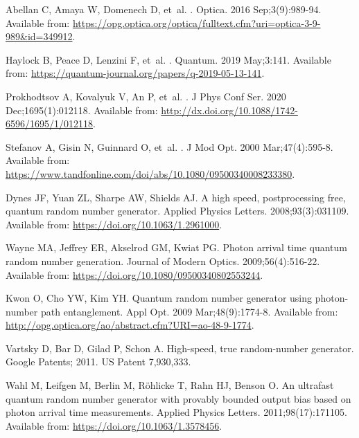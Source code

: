 \documentclass[]{interact}
\theoremstyle{plain}%
\theoremstyle{definition}
\theoremstyle{remark}
\begin{document}
\begin{thebibliography}{100}
Abellan C, Amaya W, Domenech D, et~al.
.
\newblock Optica. 2016 Sep;3(9):989-94.
\newblock Available from:
  \url{https://opg.optica.org/optica/fulltext.cfm?uri=optica-3-9-989&id=349912}.

Haylock B, Peace D, Lenzini F, et~al.
.
\newblock Quantum. 2019 May;3:141.
\newblock Available from:
  \url{https://quantum-journal.org/papers/q-2019-05-13-141}.

Prokhodtsov A, Kovalyuk V, An P, et~al.
.
\newblock J Phys Conf Ser. 2020 Dec;1695(1):012118.
\newblock Available from:
  \url{http://dx.doi.org/10.1088/1742-6596/1695/1/012118}.

Stefanov A, Gisin N, Guinnard O, et~al.
.
\newblock J Mod Opt. 2000 Mar;47(4):595-8.
\newblock Available from:
  \url{https://www.tandfonline.com/doi/abs/10.1080/09500340008233380}.

Dynes JF, Yuan ZL, Sharpe AW, Shields AJ.
\newblock A high speed, postprocessing free, quantum random number generator.
\newblock Applied Physics Letters. 2008;93(3):031109.
\newblock Available from: \url{https://doi.org/10.1063/1.2961000}.

Wayne MA, Jeffrey ER, Akselrod GM, Kwiat PG.
\newblock Photon arrival time quantum random number generation.
\newblock Journal of Modern Optics. 2009;56(4):516-22.
\newblock Available from: \url{https://doi.org/10.1080/09500340802553244}.

Kwon O, Cho YW, Kim YH.
\newblock Quantum random number generator using photon-number path
  entanglement.
\newblock Appl Opt. 2009 Mar;48(9):1774-8.
\newblock Available from:
  \url{http://opg.optica.org/ao/abstract.cfm?URI=ao-48-9-1774}.

Vartsky D, Bar D, Gilad P, Schon A. High-speed, true random-number generator.
  Google Patents; 2011.
\newblock US Patent 7,930,333.

Wahl M, Leifgen M, Berlin M, Röhlicke T, Rahn HJ, Benson O.
\newblock An ultrafast quantum random number generator with provably bounded
  output bias based on photon arrival time measurements.
\newblock Applied Physics Letters. 2011;98(17):171105.
\newblock Available from: \url{https://doi.org/10.1063/1.3578456}.


\end{thebibliography}
\end{document}
